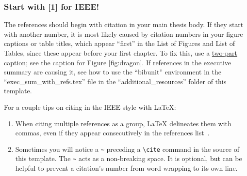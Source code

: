 \ifinforms
\else
\let\citep\cite
\let\citet\cite
\fi

\subsubsection{Start with [1] for IEEE!}\label{sec:firstone}
The references should begin with citation \citep{pollan_2006} in your main thesis body. If they start with another number, it is most likely caused by citation numbers in your figure captions or table titles, which appear ``first'' in the List of Figures and List of Tables, since these appear before your first chapter. To fix this, use a \underline{two-part caption}; see the caption for Figure \ref{fig:dragon}. If references in the executive summary are causing it, see how to use the ``bibunit'' environment in the ``exec\_sum\_with\_refs.tex'' file in the ``additional\_resources'' folder of this template.

For a couple tips on citing in the IEEE style with \LaTeX{}:
\begin{enumerate}
    \item When citing multiple references as a group, \LaTeX{} delineates them with commas, even if they appear consecutively in the references list~\cite{pollan_2006,Crabtree:Chaplin:2013,DOD.8570.01-M}.
    \item Sometimes you will notice a \verb|~| preceding a \verb|\cite| command in the source of this template.  The \verb|~| acts as a non-breaking space.  It is optional, but can be helpful to prevent a citation's number from word wrapping to its own line.
\end{enumerate}

